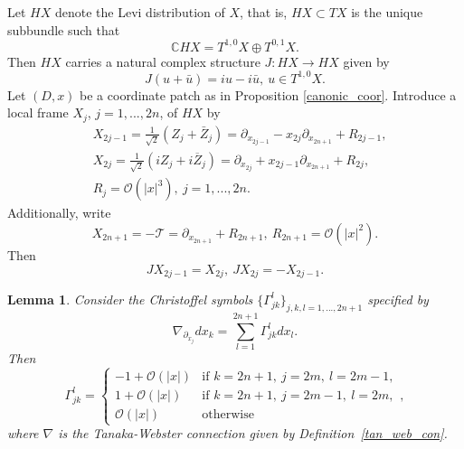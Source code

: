 \documentclass{article}
\newtheorem{lemma}[theorem]{Lemma}
\newcommand{\CC}{\mathbb C}
\newcommand{\mct}{\mathcal T}
\newcommand{\mco}{\mathcal O}
\begin{document}
Let $HX$ denote the Levi distribution of $X$, that is, $HX \subset TX$ is the unique subbundle such that $$\CC HX = T^{1,0}X \oplus T^{0,1}X.$$
%
Then $HX$ carries a natural complex structure $J : HX \to HX$ given by \begin{equation}\label{cplx_str}J(u + \bar u) = iu - i \bar u,\ u \in T^{1,0}X.\end{equation}
%
%
Let $(D,x)$ be a coordinate patch as in Proposition \ref{canonic_coor}. Introduce a local frame $X_j$, $j = 1,...,2n$, of $HX$ by\begin{equation}\label{levi_frame}\begin{aligned} & X_{2j-1} = \frac 1{\sqrt 2} \left(Z_j + \bar Z_j\right) = \partial_{x_{2j-1}} - x_{2j} \partial_{x_{2n+1}} + R_{2j-1},\\ & X_{2j} = \frac 1{\sqrt 2} \left(i Z_j + \overline{i Z_j} \right) = \partial_{x_{2j}} + x_{2j-1} \partial_{x_{2n+1}} + R_{2j},\\ &R_j = \mco(|x|^3),\ j = 1,...,2n.\end{aligned}\end{equation}
%
Additionally, write \begin{equation}\label{x2n+1}X_{2n+1} = - \mct = \partial_{x_{2n+1}} + R_{2n+1},\ R_{2n+1} = \mco(|x|^2).\end{equation}
Then \begin{equation*} J X_{2j-1} = X_{2j},\ J X_{2j} = - X_{2j-1}.\end{equation*}
%
\begin{lemma}\label{christoffel_symbols_lemma} Consider the Christoffel symbols $\{\Gamma_{jk}^l\}_{j,k,l = 1,...,2n+1}$ specified by $$\nabla_{\partial_{x_j}} d{x_k} = \sum_{l=1}^{2n+1} \Gamma^l_{jk} d x_l.$$
Then $$\Gamma^l_{jk} = \left\{\begin{array}{ll} -1+ \mco(|x|)& \text{if } k = 2n+1,\ j = 2m,\ l = 2m-1,\\ 1+ \mco(|x|)& \text{if } k = 2n+1,\ j= 2m-1,\ l = 2m,\\ \mco(|x|) & \text{otherwise} \end{array}\right. ,$$ 
where $\nabla$ is the Tanaka-Webster connection given by Definition~\ref{tan_web_con}. 
%
%
\end{lemma}
%
\end{document}
